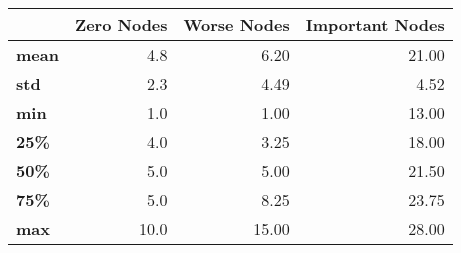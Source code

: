 \begin{tabular}{lrrr}
\toprule
{} &  Zero Nodes &  Worse Nodes &  Important Nodes \\
\midrule
\textbf{mean} &         4.8 &         6.20 &            21.00 \\
\textbf{std } &         2.3 &         4.49 &             4.52 \\
\textbf{min } &         1.0 &         1.00 &            13.00 \\
\textbf{25\% } &         4.0 &         3.25 &            18.00 \\
\textbf{50\% } &         5.0 &         5.00 &            21.50 \\
\textbf{75\% } &         5.0 &         8.25 &            23.75 \\
\textbf{max } &        10.0 &        15.00 &            28.00 \\
\bottomrule
\end{tabular}
